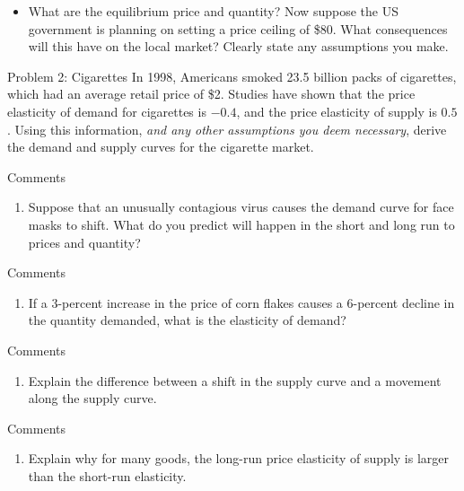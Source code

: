 \documentclass[10pt]{beamer}
\begin{document}
\begin{frame}[t]
  \begin{itemize}
    \item[c.] What are the equilibrium price and quantity?
    Now suppose the US government is planning on setting a price ceiling of \$80. What consequences will this have on the local market? Clearly state any assumptions you make.
  \end{itemize}
\end{frame}

\begin{frame}[t]{Problem 2: Cigarettes}
    In 1998, Americans smoked 23.5 billion packs of cigarettes, which had an average retail price of \$2.
    Studies have shown that the price elasticity of demand for cigarettes is \(-0.4\), and the price elasticity of supply is \(0.5\).
    Using this information, \emph{and any other assumptions you deem necessary}, derive the demand and supply curves for the cigarette market.
\end{frame}

\begin{frame}[t]{Comments}
  \begin{enumerate}
    \item Suppose that an unusually contagious virus causes the demand curve for face masks to shift. What do you predict will happen in the short and long run to prices and quantity?
  \end{enumerate}
\end{frame}

\begin{frame}[t]{Comments}
  \begin{enumerate}
    \item[2.] If a 3-percent increase in the price of corn flakes causes a 6-percent decline in the quantity demanded, what is the elasticity of demand?
  \end{enumerate}
\end{frame}

\begin{frame}[t]{Comments}
  \begin{enumerate}
    \item[3.] Explain the difference between a shift in the supply curve and a movement along the supply curve.
  \end{enumerate}
\end{frame}

\begin{frame}[t]{Comments}
  \begin{enumerate}
    \item[4.] Explain why for many goods, the long-run price elasticity of supply is larger than the short-run elasticity.
  \end{enumerate}
\end{frame}
\end{document}
